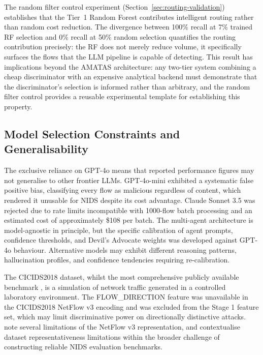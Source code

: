 The random filter control experiment (Section~\ref{sec:routing-validation}) establishes that the Tier~1 Random Forest contributes intelligent routing rather than random cost reduction. The divergence between 100\% recall at 7\% trained RF selection and 0\% recall at 50\% random selection quantifies the routing contribution precisely: the RF does not merely reduce volume, it specifically surfaces the flows that the LLM pipeline is capable of detecting. This result has implications beyond the AMATAS architecture: any two-tier system combining a cheap discriminator with an expensive analytical backend must demonstrate that the discriminator's selection is informed rather than arbitrary, and the random filter control provides a reusable experimental template for establishing this property.

\subsection{Model Selection Constraints and Generalisability}

The exclusive reliance on GPT-4o means that reported performance figures may not generalise to other frontier LLMs. GPT-4o-mini exhibited a systematic false positive bias, classifying every flow as malicious regardless of content, which rendered it unusable for NIDS despite its cost advantage. Claude Sonnet 3.5 was rejected due to rate limits incompatible with 1000-flow batch processing and an estimated cost of approximately \$108 per batch. The multi-agent architecture is model-agnostic in principle, but the specific calibration of agent prompts, confidence thresholds, and Devil's Advocate weights was developed against GPT-4o behaviour. Alternative models may exhibit different reasoning patterns, hallucination profiles, and confidence tendencies requiring re-calibration.

The CICIDS2018 dataset, whilst the most comprehensive publicly available benchmark \autocite{Sharafaldin2018, Leevy2020}, is a simulation of network traffic generated in a controlled laboratory environment. The FLOW\_DIRECTION feature was unavailable in the CICIDS2018 NetFlow v3 encoding and was excluded from the Stage 1 feature set, which may limit discriminative power on directionally distinctive attacks. \textcite{Sarhan2021} note several limitations of the NetFlow v3 representation, and \textcite{FengSakurai2025} contextualise dataset representativeness limitations within the broader challenge of constructing reliable NIDS evaluation benchmarks.


